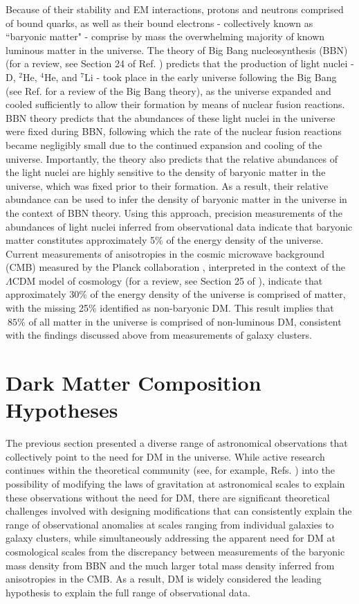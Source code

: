 Because of their stability and EM interactions, protons and neutrons comprised of bound quarks, as well as their bound electrons - collectively known as ``baryonic matter" - comprise by mass the overwhelming majority of known luminous matter in the universe. The theory of Big Bang nucleosynthesis (BBN) (for a review, see Section 24 of Ref. \cite{pdg_2020}) predicts that the production of light nuclei - D, \(^2\)He, \(^4\)He, and \(^7\)Li - took place in the early universe following the Big Bang (see Ref. \cite{uzan2016bigbang} for a review of the Big Bang theory), as the universe expanded and cooled sufficiently to allow their formation by means of nuclear fusion reactions. BBN theory predicts that the abundances of these light nuclei in the universe were fixed during BBN, following which the rate of the nuclear fusion reactions became negligibly small due to the continued expansion and cooling of the universe. Importantly, the theory also predicts that the relative abundances of the light nuclei are highly sensitive to the density of baryonic matter in the universe, which was fixed prior to their formation. As a result, their relative abundance can be used to infer the density of baryonic matter in the universe in the context of BBN theory. Using this approach, precision measurements of the abundances of light nuclei inferred from observational data indicate that baryonic matter constitutes approximately 5\% \cite{pdg_2020} of the energy density of the universe. Current measurements of anisotropies in the cosmic microwave background (CMB) \cite{cmb_1965} measured by the Planck collaboration \cite{Planck_2020}, interpreted in the context of the \(\Lambda\)CDM model of cosmology (for a review, see Section 25 of \cite{pdg_2020}), indicate that approximately 30\% of the energy density of the universe is comprised of matter, with the missing 25\% identified as non-baryonic DM. This result implies that \(~85\%\) of all matter in the universe is comprised of non-luminous DM, consistent with the findings discussed above from measurements of galaxy clusters.

\section{Dark Matter Composition Hypotheses}

The previous section presented a diverse range of astronomical observations that collectively point to the need for DM in the universe. While active research continues within the theoretical community (see, for example, Refs. \cite{mond_2012, mond_2021}) into the possibility of modifying the laws of gravitation at astronomical scales to explain these observations without the need for DM, there are significant theoretical challenges involved with designing modifications that can consistently explain the range of observational anomalies at scales ranging from individual galaxies to galaxy clusters, while simultaneously addressing the apparent need for DM at cosmological scales from the discrepancy between measurements of the baryonic mass density from BBN and the much larger total mass density inferred from anisotropies in the CMB. As a result, DM is widely considered the leading hypothesis to explain the full range of observational data.

